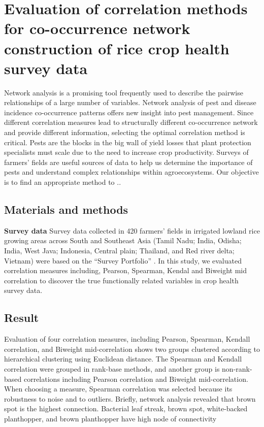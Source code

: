\section{Evaluation of correlation methods for co-occurrence network construction of rice crop health survey data}

Network analysis is a promising tool frequently used to describe the pairwise relationships of a large number of variables. Network analysis of pest and disease incidence co-occurrence patterns offers new insight into pest management. Since different correlation measures lead to structurally different co-occurrence network and provide different information, selecting the optimal correlation method is critical. Pests are the blocks in the big wall of yield losses that plant protection specialists must scale due to the need to increase crop productivity. Surveys of farmers’ fields are useful sources of data to help us determine the importance of pests and understand complex relationships within agroecosystems. Our objective is to find an appropriate method to ..

% 
\subsection{Materials and methods}
\textbf{Survey data}
Survey data collected in 420 farmers’ fields in irrigated lowland rice growing areas across South and Southeast Asia (Tamil Nadu; India, Odisha; India, West Java; Indonesia, Central plain; Thailand, and Red river delta; Vietnam) were based on the “Survey Portfolio” . In this study, we evaluated correlation measures including, Pearson, Spearman, Kendal and Biweight mid correlation to discover the true functionally related variables in crop health survey data.

\subsection{Result}
Evaluation of four correlation measures, including Pearson, Spearman, Kendall correlation, and Biweight mid-correlation shows two groups clustered according to hierarchical clustering using Euclidean distance. The Spearman and Kendall correlation were grouped in rank-base methods, and another group is non-rank-based correlations including Pearson correlation and Biweight mid-correlation. When choosing a measure, Spearman correlation was selected because its robustness to noise and to outliers.
Briefly, network analysis revealed that brown spot is the highest connection. Bacterial leaf streak, brown spot, white-backed planthopper, and brown planthopper have high node of connectivity

